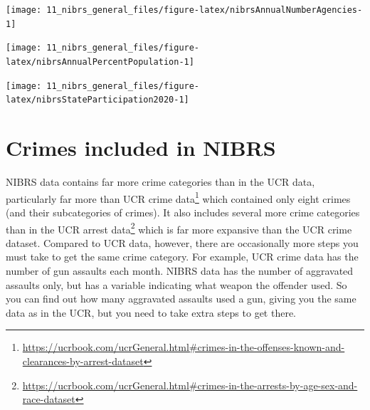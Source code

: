 \documentclass[
]{krantz}
\let\origfigure\figure
\let\endorigfigure\endfigure
\renewenvironment{figure}[1][2] {
    \expandafter\origfigure\expandafter[H]
} {
    \endorigfigure
}
\renewcommand{\href}[2]{#2\footnote{\url{#1}}}
\begin{document}
\begin{figure}

{\centering \texttt{[image: 11\_nibrs\_general\_files/figure-latex/nibrsAnnualNumberAgencies-1]} 

}

\caption{The annual number of police agencies that report data to NIBRS.}\label{fig:nibrsAnnualNumberAgencies}
\end{figure}

\begin{figure}

{\centering \texttt{[image: 11\_nibrs\_general\_files/figure-latex/nibrsAnnualPercentPopulation-1]} 

}

\caption{The annual percent of the United States population that is covered by an agency reporting data to NIBRS.}\label{fig:nibrsAnnualPercentPopulation}
\end{figure}

\begin{figure}

{\centering \texttt{[image: 11\_nibrs\_general\_files/figure-latex/nibrsStateParticipation2020-1]} 

}

\caption{The percent of each state's population that is covered by police agencies reporting at least one month of data to NIBRS.}\label{fig:nibrsStateParticipation2020}
\end{figure}

\section{Crimes included in
NIBRS}\label{crimes-included-in-nibrs}

NIBRS data contains far more crime categories than in the
UCR data, particularly far more than
\href{https://ucrbook.com/ucrGeneral.html\#crimes-in-the-offenses-known-and-clearances-by-arrest-dataset}{UCR
crime data} which contained only eight crimes (and their
subcategories of crimes). It also includes several more
crime categories than in the
\href{https://ucrbook.com/ucrGeneral.html\#crimes-in-the-arrests-by-age-sex-and-race-dataset}{UCR
arrest data} which is far more expansive than the UCR crime
dataset. Compared to UCR data, however, there are
occasionally more steps you must take to get the same crime
category. For example, UCR crime data has the number of gun
assaults each month. NIBRS data has the number of aggravated
assaults only, but has a variable indicating what weapon the
offender used. So you can find out how many aggravated
assaults used a gun, giving you the same data as in the UCR,
but you need to take extra steps to get there.
\end{document}

